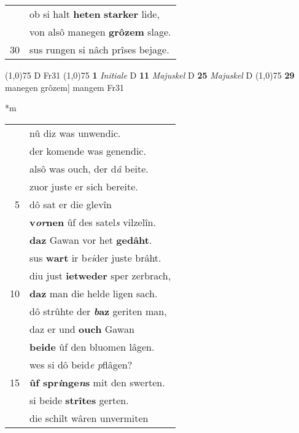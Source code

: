 \documentclass[8pt,a4paper,notitlepage]{article}
\begin{document}
\begin{table}[ht]
\begin{minipage}[t]{0.5\linewidth}
\begin{tabular}{rl}
 & ob si halt \textbf{heten} \textbf{starker} lide,\\ 
 & von alsô manegen \textbf{grôzem} slage.\\ 
30 & sus rungen si nâch prîses bejage.\\ 
\end{tabular}
\scriptsize
\line(1,0){75} \newline
D Fr31 \newline
\line(1,0){75} \newline
\textbf{1} \textit{Initiale} D  \textbf{11} \textit{Majuskel} D  \textbf{25} \textit{Majuskel} D  \newline
\line(1,0){75} \newline
\textbf{29} manegen grôzem] mangem Fr31 \newline
\end{minipage}
\hspace{0.5cm}
\begin{minipage}[t]{0.5\linewidth}
\small
\begin{center}*m
\end{center}
\begin{tabular}{rl}
 & nû diz was unwendic.\\ 
 & der komende was genendic.\\ 
 & alsô was ouch, der d\textit{â} beite.\\ 
 & zuor juste er sich bereite.\\ 
5 & dô sat er die glevîn\\ 
 & \textbf{v\textit{or}nen} ûf des satel\textit{s} vilzelîn.\\ 
 & \textbf{daz} Gawan vor het \textbf{gedâht}.\\ 
 & sus \textbf{wart} ir b\textit{ei}der juste brâht.\\ 
 & diu just \textbf{ietweder} sper zerbrach,\\ 
10 & \textbf{daz} man die helde ligen sach.\\ 
 & dô strûhte der \textbf{\textit{b}az} geriten man,\\ 
 & daz er und \textbf{ouch} Gawan\\ 
 & \textbf{beide} ûf den bluomen lâgen.\\ 
 & wes si dô beid\textit{e} \textit{p}flâgen?\\ 
15 & \textbf{ûf spr\textit{i}nge\textit{n}s} mit den swerten.\\ 
 & si beide \textbf{strîtes} gerten.\\ 
 & die schilt wâren unvermiten\\ 

\end{tabular}
\end{minipage}
\end{table}
\end{document}
